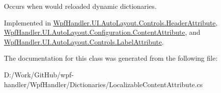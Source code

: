 Occurs when would reloaded dynamic dictionaries. 



Implemented in \mbox{\hyperlink{class_wpf_handler_1_1_u_i_1_1_auto_layout_1_1_controls_1_1_header_attribute_ae2587a69606cda16cc87e901140f113a}{Wpf\+Handler.\+U\+I.\+Auto\+Layout.\+Controls.\+Header\+Attribute}}, \mbox{\hyperlink{class_wpf_handler_1_1_u_i_1_1_auto_layout_1_1_configuration_1_1_content_attribute_a498818bc121b7f408af302eb4085056a}{Wpf\+Handler.\+U\+I.\+Auto\+Layout.\+Configuration.\+Content\+Attribute}}, and \mbox{\hyperlink{class_wpf_handler_1_1_u_i_1_1_auto_layout_1_1_controls_1_1_label_attribute_a3ed5f61dc946ffd5ce385cc4ef60362d}{Wpf\+Handler.\+U\+I.\+Auto\+Layout.\+Controls.\+Label\+Attribute}}.



The documentation for this class was generated from the following file\+:\begin{DoxyCompactItemize}
\item 
D\+:/\+Work/\+Git\+Hub/wpf-\/handler/\+Wpf\+Handler/\+Dictionaries/Localizable\+Content\+Attribute.\+cs\end{DoxyCompactItemize}
